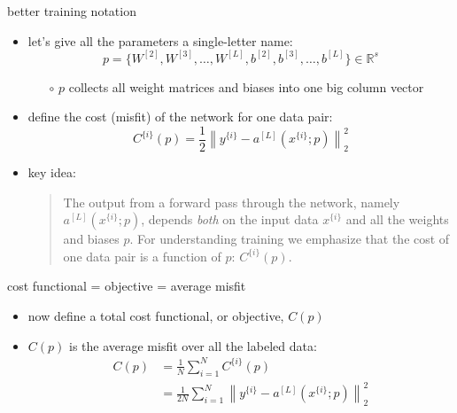 \documentclass[xcolor={svgnames},
               hyperref={colorlinks,citecolor=DeepPink4,linkcolor=FireBrick,urlcolor=Maroon}]
               {beamer}
\newcommand{\RR}{\mathbb{R}}
\begin{document}
\begin{frame}{better training notation}

\begin{itemize}
\item let's give all the parameters a single-letter name:
   $$p = \{W^{[2]},W^{[3]},\dots,W^{[L]},b^{[2]},b^{[3]},\dots,b^{[L]}\} \in \RR^s$$

    \begin{itemize}
    \item[$\circ$] $p$ collects all weight matrices and biases into one big column vector
    \end{itemize}
\item define the cost (misfit) of the network for one data pair:
    $$C^{\{i\}}(p) = \frac{1}{2} \left\|y^{\{i\}} - a^{[L]}(x^{\{i\}}; p)\right\|_2^2$$
\item key idea:

\medskip
\begin{quote}
The output from a forward pass through the network, namely $a^{[L]}(x^{\{i\}}; p)$, depends \emph{both} on the input data $x^{\{i\}}$ and all the weights and biases $p$.  For understanding training we emphasize that the cost of one data pair is a function of $p$: $C^{\{i\}}(p)$.
\end{quote}
\end{itemize}
\end{frame}


\begin{frame}{cost functional = objective = average misfit}

\begin{itemize}
\item now define a total \alert{cost functional}, or \alert{objective}, $C(p)$
\item $C(p)$ is the \alert{average} misfit over all the labeled data:
\begin{align*}
C(p) &= \frac{1}{N} \sum_{i=1}^N C^{\{i\}}(p) \\
     &= \frac{1}{2N} \sum_{i=1}^N \left\|y^{\{i\}} - a^{[L]}(x^{\{i\}}; p)\right\|_2^2
\end{align*}
\end{itemize}
\end{frame}
\end{document}
